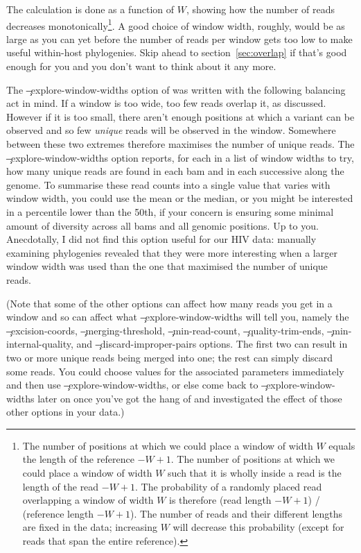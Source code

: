 The calculation is done as a function of $W$, showing how the number of reads decreases monotonically\footnote{
The number of positions at which we could place a window of width $W$ equals the length of the reference $- W + 1$.
The number of positions at which we could place a window of width $W$ such that it is wholly inside a read is the length of the read $- W + 1$.
The probability of a randomly placed read overlapping a window of width $W$ is therefore (read length $- W + 1$) / (reference length $- W + 1$).
The number of reads and their different lengths are fixed in the data; increasing $W$ will decrease this probability (except for reads that span the entire reference).}.
A good choice of window width, roughly, would be as large as you can yet before the number of reads per window gets too low to make useful within-host phylogenies.
Skip ahead to section~\ref{sec:overlap} if that's good enough for you and you don't want to think about it any more.

The \c{--explore-window-widths} option of \pmt was written with the following balancing act in mind.
If a window is too wide, too few reads overlap it, as discussed.
However if it is too small, there aren't enough positions at which a variant can be observed and so few {\it unique} reads will be observed in the window.
Somewhere between these two extremes therefore maximises the number of unique reads.
The \c{--explore-window-widths} option reports, for each in a list of window widths to try, how many unique reads are found in each bam and in each successive along the genome.
To summarise these read counts into a single value that varies with window width, you could use the mean or the median, or you might be interested in a percentile lower than the 50th, if your concern is ensuring some minimal amount of diversity across all bams and all genomic positions.
Up to you.
Anecdotally, I did not find this option useful for our HIV data: manually examining phylogenies revealed that they were more interesting when a larger window width was used than the one that maximised the number of unique reads.

(Note that some of the other options can affect how many reads you get in a window and so can affect what \c{--explore-window-widths} will tell you, namely the \c{--excision-coords}, \c{--merging-threshold}, \c{--min-read-count}, \c{--quality-trim-ends}, \c{--min-internal-quality}, and \c{--discard-improper-pairs} options.
The first two can result in two or more unique reads being merged into one; the rest can simply discard some reads.
You could choose values for the associated parameters immediately and then use \c{--explore-window-widths}, or else come back to \c{--explore-window-widths} later on once you've got the hang of \pmt and investigated the effect of those other options in your data.)  

